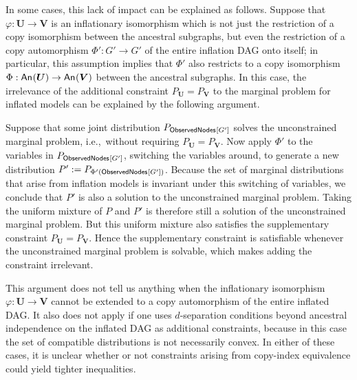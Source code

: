 {In some cases, this lack of impact can be explained as follows.
Suppose that $\varphi:\bm{U}\to\bm{V}$ is an inflationary isomorphism 
which is not just the restriction of a copy isomorphism between the ancestral subgraphs, but even the restriction of a copy automorphism 
$\Phi':G'\to G'$ of the entire inflation DAG onto itself; in particular, this assumption implies that $\Phi'$ also restricts to a copy isomorphism $\Phi:{\mathsf{An}_{}}\lparen\bm{U}\rparen\to{\mathsf{An}_{}}\lparen\bm{V}\rparen$ between the ancestral subgraphs. In this case, the irrelevance of the additional constraint $P_{\bm{U}} = P_{\bm{V}}$ to the marginal problem for inflated models can be explained by the following argument. 

Suppose that some joint distribution $P_{{\operatorname{\mathsf{ObservedNodes}}_{}}\lbrack G'\rbrack}$ solves the unconstrained marginal problem, i.e.,~without requiring $P_{\bm{U}} = P_{\bm{V}}$. Now apply $\Phi'$ to the variables in $P_{{\operatorname{\mathsf{ObservedNodes}}_{}}\lbrack G'\rbrack}$, switching the variables around, to generate a new distribution $P':=P_{\Phi'({\operatorname{\mathsf{ObservedNodes}}_{}}\lbrack G'\rbrack)}$. Because the set of marginal distributions that arise from inflation models is invariant under this switching of variables, we conclude that $P'$ is also a solution to the unconstrained marginal problem. Taking the uniform mixture of $P$ and $P'$ is therefore still a solution of the unconstrained marginal problem. But this uniform mixture also satisfies the supplementary constraint $P_{\bm{U}} = P_{\bm{V}}$. Hence the supplementary constraint is satisfiable whenever the unconstrained marginal problem is solvable, which makes adding the constraint irrelevant.

This argument does not tell us anything when the inflationary isomorphism $\varphi:\bm{U}\to\bm{V}$ cannot be extended to a copy automorphism of the entire inflated DAG. It also does not apply if one uses $d$-separation conditions beyond ancestral independence  on the inflated DAG as additional constraints, because in this case the set of compatible distributions is not necessarily convex.  In either of these cases, it is unclear whether or not constraints arising from copy-index equivalence could yield tighter inequalities. 



}
